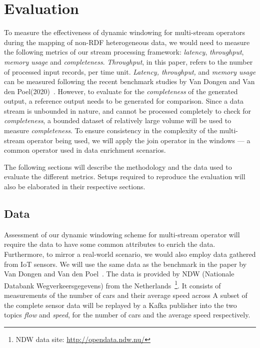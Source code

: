 \chapter{Evaluation}
\label{chap:Evaluation}

To measure the effectiveness of dynamic windowing for multi-stream operators during the 
mapping of non-RDF heterogeneous data, we would need to measure the following 
metrics of our stream processing framework: \emph{latency}, \emph{throughput},
\emph{memory usage} and \emph{completeness}. \emph{Throughput}, in this 
paper, refers to the number of processed input records, per time unit.
\emph{Latency, throughput,} and \emph{memory usage} can be measured following the recent benchmark studies by 
Van Dongen and Van den Poel(2020)~\cite{evalution_of_spe}.
However, to evaluate 
for the \emph{completeness}
of the generated output, a reference output needs 
to be generated for comparison. Since a data stream is unbounded in nature, 
and cannot be processed completely to check for \emph{completeness}, a bounded 
dataset of relatively large volume will be used to measure \emph{completeness}.
To ensure consistency in the complexity of the multi-stream operator being used, 
we will apply the join operator in the windows --- a common operator used in 
data enrichment scenarios. 

The following sections will describe the methodology and the data used to evaluate the
different metrics. Setups required to reproduce the evaluation will also be elaborated 
in their respective sections. 


\section{Data}

Assessment of our dynamic windowing scheme for multi-stream operator will require 
the data to have some common attributes to enrich the data. Furthermore, to 
mirror a real-world scenario, we would also employ data gathered from IoT sensors. 
We will use the same data 
as the benchmark in the paper by Van Dongen and Van den Poel~\cite{evalution_of_spe}. 
The data is provided by NDW (Nationale Databank Wegverkeersgegevens) from the 
Netherlands~\footnote{NDW data site: \href{http://opendata.ndw.nu/}{http://opendata.ndw.nu/} }.
It consists of measurements of the number of cars and their average speed across  
A subset of the complete sensor data will be replayed by a Kafka publisher into the two topics 
\emph{flow} and \emph{speed}, for the number of cars and the average speed respectively. 

